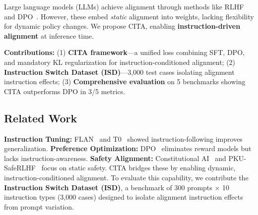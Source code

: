 
\label{sec:introduction}

Large language models (LLMs) achieve alignment through methods like RLHF~\cite{ouyang2022training} and DPO~\cite{rafailov2023direct}. However, these embed \textit{static} alignment into weights, lacking flexibility for dynamic policy changes. We propose CITA, enabling \textbf{instruction-driven alignment} at inference time.

\noindent\textbf{Contributions:} (1) \textbf{CITA framework}---a unified loss combining SFT, DPO, and mandatory KL regularization for instruction-conditioned alignment; (2) \textbf{Instruction Switch Dataset (ISD)}---3,000 test cases isolating alignment instruction effects; (3) \textbf{Comprehensive evaluation} on 5 benchmarks showing CITA outperforms DPO in 3/5 metrics.

\subsection{Related Work}

\textbf{Instruction Tuning:} FLAN~\cite{wei2022finetuned} and T0~\cite{sanh2022multitask} showed instruction-following improves generalization. \textbf{Preference Optimization:} DPO~\cite{rafailov2023direct} eliminates reward models but lacks instruction-awareness. \textbf{Safety Alignment:} Constitutional AI~\cite{bai2022constitutional} and PKU-SafeRLHF~\cite{ji2024pku} focus on static safety. CITA bridges these by enabling dynamic, instruction-conditioned alignment. To evaluate this capability, we contribute the \textbf{Instruction Switch Dataset (ISD)}, a benchmark of 300 prompts $\times$ 10 instruction types (3,000 cases) designed to isolate alignment instruction effects from prompt variation.
